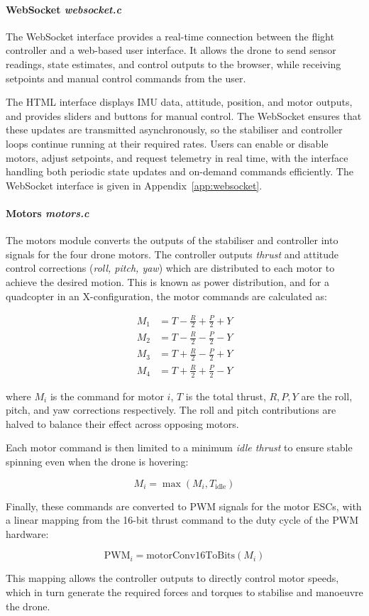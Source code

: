 \paragraph{\textbf{WebSocket} \textit{websocket.c}} \leavevmode

The WebSocket interface provides a real-time connection between the flight controller and a web-based user interface. It allows the drone to send sensor readings, state estimates, and control outputs to the browser, while receiving setpoints and manual control commands from the user.  

The HTML interface displays IMU data, attitude, position, and motor outputs, and provides sliders and buttons for manual control. The WebSocket ensures that these updates are transmitted asynchronously, so the stabiliser and controller loops continue running at their required rates. Users can enable or disable motors, adjust setpoints, and request telemetry in real time, with the interface handling both periodic state updates and on-demand commands efficiently. The WebSocket interface is given in Appendix~\ref{app:websocket}.

\paragraph{\textbf{Motors} \textit{motors.c}} \leavevmode

The motors module converts the outputs of the stabiliser and controller into signals for the four drone motors. The controller outputs \textit{thrust} and attitude control corrections (\textit{roll, pitch, yaw}) which are distributed to each motor to achieve the desired motion. This is known as power distribution, and for a quadcopter in an X-configuration, the motor commands are calculated as:

\[
\begin{aligned}
M_1 &= T - \frac{R}{2} + \frac{P}{2} + Y \\
M_2 &= T - \frac{R}{2} - \frac{P}{2} - Y \\
M_3 &= T + \frac{R}{2} - \frac{P}{2} + Y \\
M_4 &= T + \frac{R}{2} + \frac{P}{2} - Y
\end{aligned}
\]

where \(M_i\) is the command for motor \(i\), \(T\) is the total thrust, \(R, P, Y\) are the roll, pitch, and yaw corrections respectively. The roll and pitch contributions are halved to balance their effect across opposing motors.  

Each motor command is then limited to a minimum \textit{idle thrust} to ensure stable spinning even when the drone is hovering:

\[
M_i = \max(M_i, T_\text{idle})
\]

Finally, these commands are converted to PWM signals for the motor ESCs, with a linear mapping from the 16-bit thrust command to the duty cycle of the PWM hardware:

\[
\text{PWM}_{i} = \text{motorConv16ToBits}(M_i)
\]

This mapping allows the controller outputs to directly control motor speeds, which in turn generate the required forces and torques to stabilise and manoeuvre the drone.